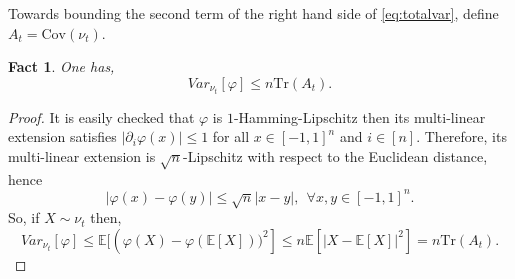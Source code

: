 \documentclass[12pt]{article}
\def \EE {\mathbb E}
\def \COV {\mathrm{Cov}}
\newtheorem{fact}[theorem]{Fact}
\theoremstyle{definition}
\theoremstyle{remark}
\begin{document}
Towards bounding the second term of the right hand side of \eqref{eq:totalvar}, define $A_t = \COV(\nu_t)$.
\begin{fact} \label{fact:smalltail}
One has,
$$
Var_{\nu_t}[\varphi] \leq n \mathrm{Tr}(A_t).
$$
\end{fact}
\begin{proof}
It is easily checked that $\varphi$ is $1$-Hamming-Lipschitz then its multi-linear extension satisfies $|\partial_i \varphi(x)| \leq 1$ for all $x \in [-1,1]^n$ and $i \in [n]$. Therefore, its multi-linear extension is $\sqrt{n}$-Lipschitz with respect to the Euclidean distance, hence
$$
\left | \varphi(x) - \varphi(y) \right | \leq \sqrt{n} |x-y|, ~~ \forall x,y \in [-1,1]^n.
$$
So, if $X \sim \nu_t$ then,
$$
Var_{\nu_t}[\varphi] \leq \EE [ \left ( \varphi(X) - \varphi(\EE[X]))^2 \right ] \leq n \EE \left [|X - \EE[X]|^2\right ] = n \mathrm{Tr}(A_t).
$$
\end{proof}
\end{document}
